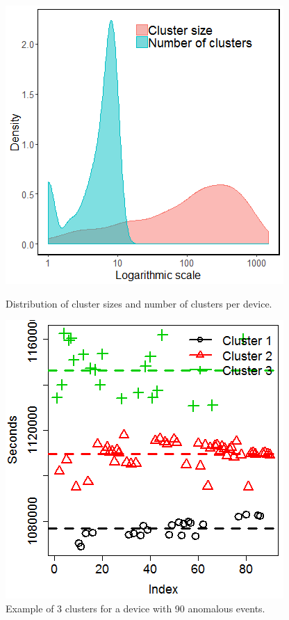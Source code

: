 \documentclass[letterpaper]{article} %
\begin{document}
\begin{figure}[h]
\begin{minipage}[t]{0.45\linewidth}
\includegraphics[width=\linewidth]{clusters.png}
\caption{Distribution of cluster sizes and number of clusters per device.}
\label{fig:clusters}
\end{minipage}%
\hfill%
\begin{minipage}[t]{0.45\linewidth}
\includegraphics[width=\linewidth]{clusterexample.png}
\caption{Example of 3 clusters for a device with 90 anomalous events. }
\label{fig:example}
\end{minipage}
\end{figure}
\end{document}

